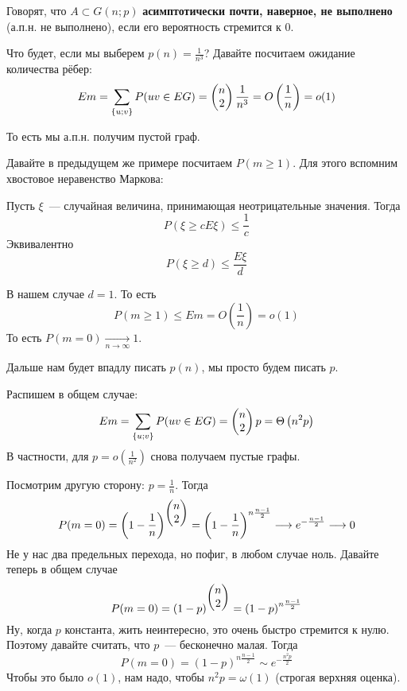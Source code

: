\documentclass{article}
\begin{document}
    \begin{definition}
        Говорят, что $A\subset G(n;p)$ \textbf{асимптотически почти, наверное, не выполнено} (а.п.н. не выполнено), если его вероятность стремится к 0.
    \end{definition}
    \begin{example}
        Что будет, если мы выберем $p(n)=\frac1{n^3}$? Давайте посчитаем ожидание количества рёбер:
        $$
        Em=\sum\limits_{\{u;v\}}P(uv\in EG)=\left(\begin{matrix}n\\2\end{matrix}\right)\frac1{n^3}=O\left(\frac1n\right)=o(1)
        $$
    \end{example}
    \begin{remark}
        То есть мы а.п.н. получим пустой граф.
    \end{remark}
    \begin{example}
        Давайте в предыдущем же примере посчитаем $P(m\geqslant 1)$. Для этого вспомним хвостовое неравенство Маркова:
        \begin{claim}
            Пусть $\xi$~--- случайная величина, принимающая неотрицательные значения. Тогда
            $$
            P(\xi\geqslant cE\xi)\leqslant\frac1c
            $$
            Эквивалентно
            $$
            P(\xi\geqslant d)\leqslant\frac{E\xi}d
            $$
        \end{claim}
        В нашем случае $d=1$. То есть
        $$P(m\geqslant1)\leqslant Em=O\left(\frac1n\right)=o(1)$$
        То есть $P(m=0)\underset{n\to\infty}\longrightarrow1$.
    \end{example}
    \begin{remark}
        Дальше нам будет впадлу писать $p(n)$, мы просто будем писать $p$.
    \end{remark}
    \begin{example}
        Распишем в общем случае:
        $$
        Em=\sum\limits_{\{u;v\}}P(uv\in EG)=\left(\begin{matrix}n\\2\end{matrix}\right)p=\Theta\left(n^2p\right)
        $$
        В частности, для $p=o\left(\frac1{n^2}\right)$ снова получаем пустые графы.
    \end{example}
    \begin{example}
        Посмотрим другую сторону: $p=\frac1n$. Тогда
        $$
        P(m=0)=\left(1-\frac1n\right)^{\left(\begin{matrix}n\\2\end{matrix}\right)}=\left(1-\frac1n\right)^{n\frac{n-1}2}\longrightarrow e^{-\frac{n-1}2}\longrightarrow0
        $$
        Не у нас два предельных перехода, но пофиг, в любом случае ноль. Давайте теперь в общем случае
        $$
        P(m=0)=\left(1-p\right)^{\left(\begin{matrix}n\\2\end{matrix}\right)}=\left(1-p\right)^{n\frac{n-1}2}
        $$
        Ну, когда $p$ константа, жить неинтересно, это очень быстро стремится к нулю. Поэтому давайте считать, что $p$~--- бесконечно малая. Тогда
        $$
        P(m=0)=\left(1-p\right)^{n\frac{n-1}2}\sim e^{-\frac{n^2p}2}
        $$
        Чтобы это было $o(1)$, нам надо, чтобы $n^2p=\omega(1)$ (строгая верхняя оценка).
    \end{example}
\end{document}
